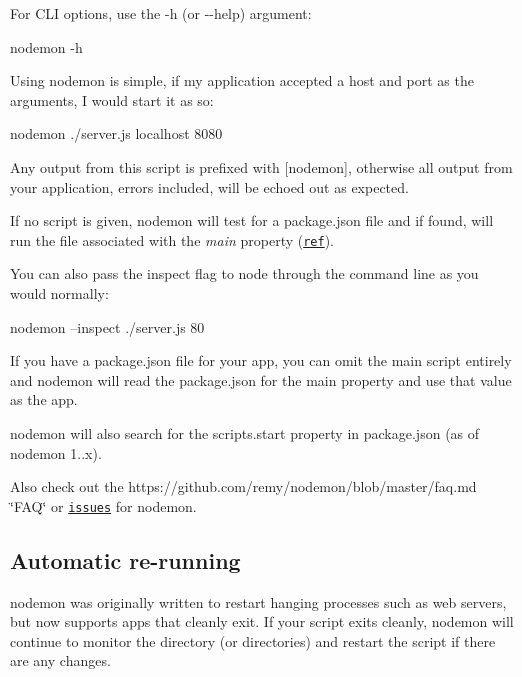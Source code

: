 For C\+LI options, use the {\ttfamily -\/h} (or {\ttfamily -\/-\/help}) argument\+:


\begin{DoxyCode}
nodemon -h
\end{DoxyCode}


Using nodemon is simple, if my application accepted a host and port as the arguments, I would start it as so\+:


\begin{DoxyCode}
nodemon ./server.js localhost 8080
\end{DoxyCode}


Any output from this script is prefixed with {\ttfamily \mbox{[}nodemon\mbox{]}}, otherwise all output from your application, errors included, will be echoed out as expected.

If no script is given, nodemon will test for a {\ttfamily package.\+json} file and if found, will run the file associated with the {\itshape main} property (\href{https://github.com/remy/nodemon/issues/14}{\tt ref}).

You can also pass the {\ttfamily inspect} flag to node through the command line as you would normally\+:


\begin{DoxyCode}
nodemon --inspect ./server.js 80
\end{DoxyCode}


If you have a {\ttfamily package.\+json} file for your app, you can omit the main script entirely and nodemon will read the {\ttfamily package.\+json} for the {\ttfamily main} property and use that value as the app.

nodemon will also search for the {\ttfamily scripts.\+start} property in {\ttfamily package.\+json} (as of nodemon 1..\+x).

Also check out the https\+://github.com/remy/nodemon/blob/master/faq.\+md \char`\"{}\+F\+A\+Q\char`\"{} or \href{https://github.com/remy/nodemon/issues}{\tt issues} for nodemon.

\subsection*{Automatic re-\/running}

nodemon was originally written to restart hanging processes such as web servers, but now supports apps that cleanly exit. If your script exits cleanly, nodemon will continue to monitor the directory (or directories) and restart the script if there are any changes.

